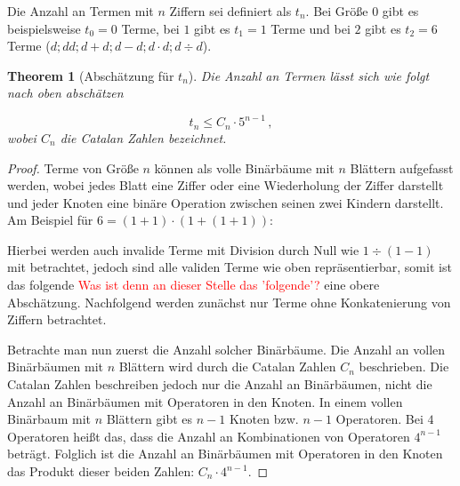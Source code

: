 \documentclass{article}
\newtheorem{theorem}{Theorem}[section]
\theoremstyle{nonumberplain}
\newtheorem{proof}{Beweis}
\begin{document}
Die Anzahl an Termen mit \(n\) Ziffern sei definiert als \(t_n\).
Bei Größe \(0\) gibt es beispielsweise \(t_0 = 0\) Terme, bei \(1\) gibt es \(t_1 = 1\) Terme und bei \(2\) gibt es \(t_2 = 6\) Terme (\(d; dd; d+d; d-d; d \cdot d; d \div d\)).

\begin{theorem}[Abschätzung für \(t_n\)]\label{theorem:tn_bound}
    Die Anzahl an Termen lässt sich wie folgt nach oben abschätzen

        \[t_n \leq C_n \cdot 5^{n-1}\,,\]
     wobei \(C_n\) die Catalan Zahlen bezeichnet.
\end{theorem}
\begin{proof}
    Terme von Größe \(n\) können als volle Binärbäume mit \(n\) Blättern aufgefasst werden, wobei jedes Blatt eine Ziffer oder eine Wiederholung der Ziffer darstellt und jeder Knoten eine binäre Operation zwischen seinen zwei Kindern darstellt.
    Am Beispiel für \(6 = (1+1)\cdot(1+(1+1))\):
    \begin{center}
    \end{center}
    Hierbei werden auch invalide Terme mit Division durch Null wie \(1 \div (1-1)\) mit betrachtet, jedoch sind alle validen Terme wie oben repräsentierbar, somit ist das folgende \textcolor{red}{Was ist denn an dieser Stelle das 'folgende'?} eine obere Abschätzung.
    Nachfolgend werden zunächst nur Terme ohne Konkatenierung von Ziffern betrachtet.

    Betrachte man nun zuerst die Anzahl solcher Binärbäume.
    Die Anzahl an vollen Binärbäumen mit \(n\) Blättern wird durch die Catalan Zahlen \(C_n\) beschrieben.
    Die Catalan Zahlen beschreiben jedoch nur die Anzahl an Binärbäumen, nicht die Anzahl an Binärbäumen mit Operatoren in den Knoten.
    In einem vollen Binärbaum mit \(n\) Blättern gibt es \(n-1\) Knoten bzw. \(n-1\) Operatoren.
    Bei \(4\) Operatoren heißt das, dass die Anzahl an Kombinationen von Operatoren \(4^{n-1}\) beträgt.
    Folglich ist die Anzahl an Binärbäumen mit Operatoren in den Knoten das Produkt dieser beiden Zahlen: \(C_n \cdot 4^{n-1}\).


\end{proof}
\end{document}
